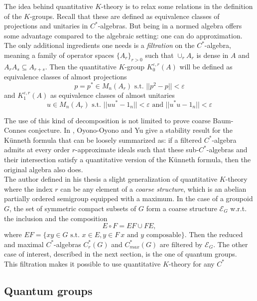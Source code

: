 The idea behind quantitative $K$-theory is to relax some relations in the definition of the $K$-groups. Recall that these are defined as equivalence classes of projections and unitaries in $C^*$-algebras. But being in a normed algebra offers some advantage compared to the algebraic setting: one can do approximation. The only additional ingredients one needs is a \textit{filtration} on the $C^*$-algebra, meaning a family of operator spaces $\{A_r\}_{r>0}$ such that $\cup_r A_r$ is dense in $A$ and $A_r A_s \subseteq A_{r+s}$. Then the quantitative $K$-group $K_0^{\varepsilon,r}(A)$ will be defined as equivalence classes of almost projections 
\[p=p^*\in M_n(A_r) \text{ s.t. } ||p^2 - p || <\varepsilon  \] 	 
and $K_1^{\varepsilon,r}(A)$ as equivalence classes of almost unitaries
\[u\in M_n(A_r) \text{ s.t. } ||uu^* - 1_n || <\varepsilon  \text{ and }  ||u^*u - 1_n || <\varepsilon \]

The use of this kind of decomposition is not limited to prove coarse Baum-Connes conjecture. In \cite{OY3}, Oyono-Oyono and Yu give a stability result for the K\"unneth formula that can be loosely summarized as: if a filtered $C^*$-algebra admits at every order $r$-approximate ideals such that these sub-$C^*$-algebras and their intersection satisfy a quantitative version of the K\"unneth formula, then the original algebra also does.\\
  
The author defined in his thesis a slight generalization of quantitative $K$-theory where the index $r$ can be any element of a \textit{coarse structure}, which is an abelian partially ordered semigroup equipped with a maximum. In the case of a groupoid $G$, the set of symmetric compact subsets of $G$ form a coarse structure $\mathcal E_G$ w.r.t. the inclusion and the composition
\[E \circ F = EF \cup FE,\]
where $EF = \{ xy \in G \text{ s.t. } x\in E, y\in F \ x\text{ and } y \text{ composable} \}$. Then the reduced and maximal $C^*$-algebras $C^*_r(G)$ and $C^*_{max}(G)$ are filtered by $\mathcal E_G$. The other case of interest, described in the next section, is the one of quantum groups.\\

This filtration makes it possible to use quantitative $K$-theory for any $C^*$
\subsection{Quantum groups}

